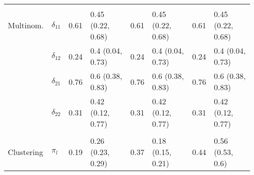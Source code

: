 \documentclass[]{article}
\begin{document}
\begin{table}[t]
\begin{tabular}{llllllll}
\addlinespace[0.3em]
\multicolumn{8}{l}{\textbf{ }}\\
\hspace{1em}Multinom. & $\delta_{11}$ & 0.61 & 0.45 (0.22, 0.68) & 0.61 & 0.45 (0.22, 0.68) & 0.61 & 0.45 (0.22, 0.68)\\
\hspace{1em} & $\delta_{12}$ & 0.24 & 0.4 (0.04, 0.73) & 0.24 & 0.4 (0.04, 0.73) & 0.24 & 0.4 (0.04, 0.73)\\
\hspace{1em} & $\delta_{21}$ & 0.76 & 0.6 (0.38, 0.83) & 0.76 & 0.6 (0.38, 0.83) & 0.76 & 0.6 (0.38, 0.83)\\
\hspace{1em} & $\delta_{22}$ & 0.31 & 0.42 (0.12, 0.77) & 0.31 & 0.42 (0.12, 0.77) & 0.31 & 0.42 (0.12, 0.77)\\
\addlinespace[0.3em]
\multicolumn{8}{l}{\textbf{ }}\\
\hspace{1em}Clustering & $\pi_l$ & 0.19 & 0.26 (0.23, 0.29) & 0.37 & 0.18 (0.15, 0.21) & 0.44 & 0.56 (0.53, 0.6)\\
\bottomrule
\end{tabular}
\end{table}
\end{document}
